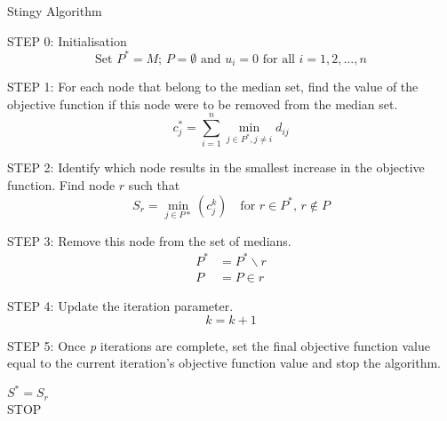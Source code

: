 \documentclass[11pt]{article}
\begin{document}
\begin{algorithm}
	\caption{Stingy Algorithm}
	\begin{algorithmic}[0] %
		\Statex 
		\Statex STEP 0: Initialisation 	
		\begin{equation*}
			\text{Set } P^*=M \text{; } P=\emptyset \text{ and } u_i=0 \text{ for all } i=1,2,\dots,n
		\end{equation*}
		
		\Statex 
		\Statex STEP 1: For each node that belong to the median set, find the value of the objective function if this node were to be removed from the median set.
		\begin{equation*}
		c_j^* = \sum_{i=1}^{n} \min_{j\in P^*, j\neq i} d_{ij}
		\end{equation*}
		
		\Statex 
		\Statex STEP 2: Identify which node results in the smallest increase in the objective function.
		\Statex Find node $r$ such that 
		\begin{equation*}
		S_r = \min_{j \in P*}(c_j^k) \quad \text{for } r \in P^* \text{, } r \notin P
		\end{equation*}
		
		
		\Statex 
		\Statex STEP 3: Remove this node from the set of medians.
		\begin{align*}
		P^* &= P^* \backslash {r}\\
		P &= P \in {r}
		\end{align*}
		
		\Statex 
		\Statex STEP 4: Update the iteration parameter.
		\begin{equation*}
		k = k+1
		\end{equation*}
		
		
		\Statex 
		\Statex STEP 5: Once \emph{p} iterations are complete, set the final objective function value equal to the current iteration's objective function value and stop the algorithm.
		\begin{center}
			$S^{*} = S_r$\\
			STOP
		\end{center}
		
		
	\end{algorithmic}
\end{algorithm}

\end{document}
